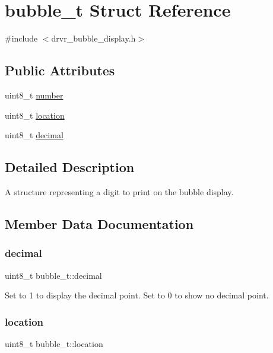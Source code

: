 \hypertarget{structbubble__t}{}\section{bubble\+\_\+t Struct Reference}
\label{structbubble__t}


{\ttfamily \#include $<$drvr\+\_\+bubble\+\_\+display.\+h$>$}

\subsection*{Public Attributes}
\begin{DoxyCompactItemize}
\item 
uint8\+\_\+t \mbox{\hyperlink{structbubble__t_a73771648a59844fc109bd68e4a1a44de}{number}}
\item 
uint8\+\_\+t \mbox{\hyperlink{structbubble__t_ab471acaaeb2ef04b214dbb4ca1184ab3}{location}}
\item 
uint8\+\_\+t \mbox{\hyperlink{structbubble__t_a979f8bd43daf5a02c778322b6658bbda}{decimal}}
\end{DoxyCompactItemize}


\subsection{Detailed Description}
A structure representing a digit to print on the bubble display. 

\subsection{Member Data Documentation}
\mbox{\label{structbubble__t_a979f8bd43daf5a02c778322b6658bbda}} 
\subsubsection{\texorpdfstring{decimal}{decimal}}
{\footnotesize\ttfamily uint8\+\_\+t bubble\+\_\+t\+::decimal}

Set to 1 to display the decimal point. Set to 0 to show no decimal point. \mbox{\label{structbubble__t_ab471acaaeb2ef04b214dbb4ca1184ab3}} 
\subsubsection{\texorpdfstring{location}{location}}
{\footnotesize\ttfamily uint8\+\_\+t bubble\+\_\+t\+::location}

